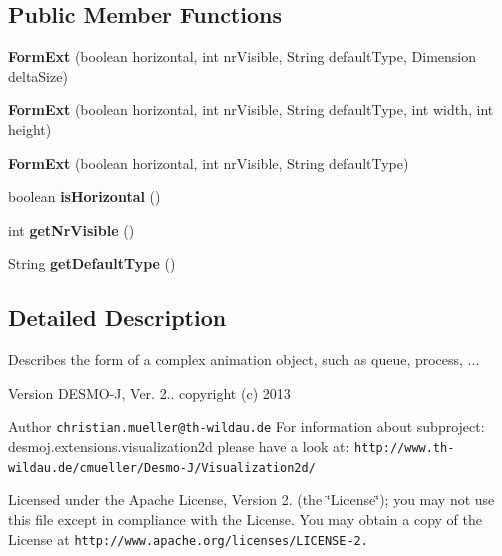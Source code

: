 \subsection*{Public Member Functions}
\begin{DoxyCompactItemize}
\item 
{\bf Form\-Ext} (boolean horizontal, int nr\-Visible, String default\-Type, Dimension delta\-Size)
\item 
{\bf Form\-Ext} (boolean horizontal, int nr\-Visible, String default\-Type, int width, int height)
\item 
{\bf Form\-Ext} (boolean horizontal, int nr\-Visible, String default\-Type)
\item 
boolean {\bfseries is\-Horizontal} ()\label{classdesmoj_1_1extensions_1_1visualization2d_1_1animation_1_1_form_ext_ac737e612bfbe744ac6022270e29d7c27}

\item 
int {\bfseries get\-Nr\-Visible} ()\label{classdesmoj_1_1extensions_1_1visualization2d_1_1animation_1_1_form_ext_a25b23d710709256a62e2fb6ad2126c32}

\item 
String {\bfseries get\-Default\-Type} ()\label{classdesmoj_1_1extensions_1_1visualization2d_1_1animation_1_1_form_ext_afb3042d5743ba40a0dd6b6575f1a0c5e}

\end{DoxyCompactItemize}


\subsection{Detailed Description}
Describes the form of a complex animation object, such as queue, process, ...

\begin{DoxyVersion}{Version}
D\-E\-S\-M\-O-\/\-J, Ver. 2.. copyright (c) 2013 
\end{DoxyVersion}
\begin{DoxyAuthor}{Author}
{\tt christian.\-mueller@th-\/wildau.\-de} For information about subproject\-: desmoj.\-extensions.\-visualization2d please have a look at\-: {\tt http\-://www.\-th-\/wildau.\-de/cmueller/\-Desmo-\/\-J/\-Visualization2d/}
\end{DoxyAuthor}
Licensed under the Apache License, Version 2. (the \char`\"{}\-License\char`\"{}); you may not use this file except in compliance with the License. You may obtain a copy of the License at {\tt http\-://www.\-apache.\-org/licenses/\-L\-I\-C\-E\-N\-S\-E-\/2.}

